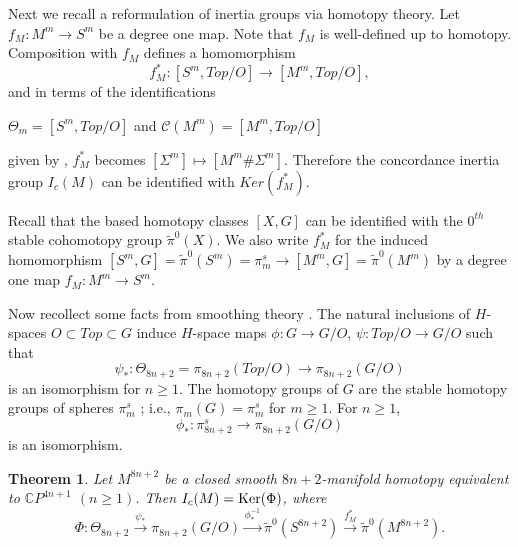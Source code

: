 \documentclass[a4paper,leqno,12pt]{amsart}
\theoremstyle{plain}
\newtheorem{theorem}{Theorem}[section]
\theoremstyle{definition}
\numberwithin{equation}{section}
\begin{document}
Next we recall a reformulation of inertia groups via homotopy theory. Let $f_{M}:M^m\to S^m $  be a degree one map. Note that $f_{M}$ is well-defined up to homotopy. Composition with $f_{M}$ defines a homomorphism
$$f_{M}^*:[S^m, Top/O]\to [M^m ,Top/O],$$ 
and in terms of the identifications
\begin{center}
$\Theta_m=[S^m, Top/O]$ and $\mathcal{C}(M^m)=[M^m ,Top/O]$
\end{center}
given by \cite[p. 25 and 194]{KS77}, $f_{M}^*$ becomes $[\Sigma^m]\mapsto [M^m\#\Sigma^m]$. Therefore the concordance inertia group $I_c(M)$ can be identified with ${\mathit{Ker}}(f_M^\ast)$.

Recall that the based homotopy classes $[X,G]$ can be identified with the $0^{th}$ stable cohomotopy group $\tilde{\pi}^0(X)$. We also write $f_{M}^*$ for the induced homomorphism $[S^m,G]=\tilde{\pi}^0(S^m)=\pi_m^s\to [M^m,G]=\tilde{\pi}^0(M^m)$ by a degree one map $f_{M}:M^m\to S^m$.

Now recollect some facts from smoothing theory \cite{Bru71a}. The natural  inclusions of $H$-spaces $O\subset Top \subset G$ induce $H$-space maps $\phi:G\to G/O$,  $\psi: Top/O\to G/O$ such that
$$\psi_{*}:\Theta_{8n+2}=\pi_{8n+2}(Top/O)\to \pi_{8n+2}(G/O)$$
is an isomorphism for $n\geq 1$. The homotopy groups of $G$ are the stable homotopy groups of spheres $\pi^{s}_m$ ; i.e., $\pi_{m}(G)=\pi^{s}_m$ for $m\geq 1$. For $n\geq 1$,
$$ \phi_{*}:\pi^{s}_{8n+2}\to \pi_{8n+2}(G/O)$$
is an isomorphism.

\begin{theorem}\label{coniner}
Let $M^{8n+2}$ be a closed smooth $8n+2$-manifold homotopy equivalent to $\mathbb{C}P^{4n+1}$ $(n\geq 1)$. Then $I_c(M)={\rm Ker}(\Phi)$, where $$\Phi: \Theta_{8n+2}\stackrel{\psi_{*}}{\rightarrow}\pi_{8n+2}(G/O)\stackrel{\phi_{*}^{-1}}{\rightarrow}\tilde{\pi}^0(S^{8n+2})\stackrel{f_{M}^*}{\longrightarrow}\tilde{\pi}^0(M^{8n+2}).$$
\end{theorem}
\end{document}
